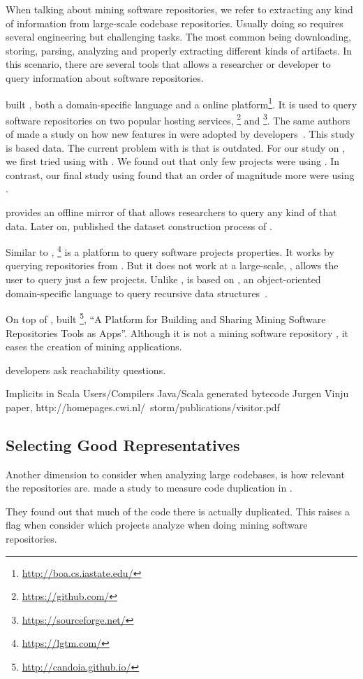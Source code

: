 When talking about mining software repositories, we refer to extracting any kind of information from large-scale codebase repositories.
Usually doing so requires several engineering but challenging tasks.
The most common being downloading, storing, parsing, analyzing and properly extracting different kinds of artifacts.
In this scenario, there are several tools that allows a researcher or developer to query information about software repositories.

\cite{dyer_boa:_2013,dyer_declarative_2013} built \boa{}, both a domain-specific language and a online platform\footnote{\url{http://boa.cs.iastate.edu/}}.
It is used to query software repositories on two popular hosting services, \github{}\footnote{\url{https://github.com/}} and \sourceforge{}\footnote{\url{https://sourceforge.net/}}.
The same authors of \boa{} made a study on how new features in \java{} were adopted by developers~\cite{dyer_mining_2014}.
This study is based \sourceforge{} data.
The current problem with \sourceforge{} is that is outdated.
For our study on \smu{}, we first tried using \boa{} with \sourceforge{}.
We found out that only few projects were using \smu{}.
In contrast, our final study using \maven{} found that an order of magnitude more were using \smu{}.

\cite{gousios_ghtorent_2013}
provides an offline mirror of \github{} that allows researchers to query any kind of that data.
Later on, \cite{gousios_lean_2014} published the dataset construction process of \github{}.

Similar to \boa{}, \lgtm{}\footnote{\url{https://lgtm.com/}} is a platform to query software projects properties.
It works by querying repositories from \github{}.
But it does not work at a large-scale, \ie{}, \lgtm{} allows the user to query just a few projects.
Unlike \boa{}, \lgtm{} is based on \ql{}, an object-oriented domain-specific language to query recursive data structures~\cite{avgustinov_ql:_2016}.

On top of \boa{}, \cite{tiwari_candoia:_2017} built \candoia{}\footnote{\url{http://candoia.github.io/}}, ``A Platform for Building and Sharing Mining Software Repositories Tools as Apps''.
Although it is not a mining software repository \perse{}, it eases the creation of mining applications.

\cite{latoza_developers_2010} developers ask reachability questions.




Implicits in Scala
Users/Compilers Java/Scala generated bytecode
Jurgen Vinju paper,
http://homepages.cwi.nl/~storm/publications/visitor.pdf


\subsection*{Selecting Good Representatives}

Another dimension to consider when analyzing large codebases, is how relevant the repositories are.
\cite{lopes_dejavu:_2017} made a study to measure code duplication in \github{}.

They found out that much of the code there is actually duplicated.
This raises a flag when consider which projects analyze when doing mining software repositories.
